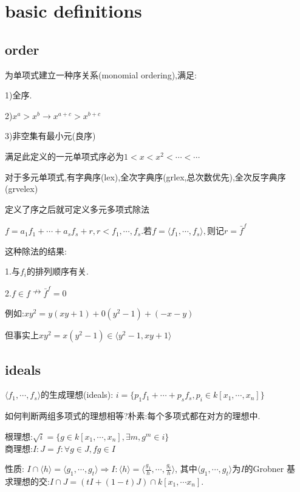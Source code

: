 
\section{basic definitions}
\subsection{order}
为单项式建立一种序关系(monomial ordering),满足:

1)全序.

2)$ x^a>x^b\rightarrow x^{a+c}>x^{b+c}$

3)非空集有最小元(良序)

满足此定义的一元单项式序必为$ 1<x<x^2<\cdots<\cdots$

对于多元单项式,有字典序(lex),全次字典序(grlex,总次数优先),全次反字典序(grvelex)

定义了序之后就可定义多元多项式除法

$ f=a_1f_1+\cdots+a_sf_s+r,r<f_1,\cdots,f_s$.若$ f=\langle f_1,\cdots,f_s \rangle,$则记$ r=\bar{f}^{f}$

这种除法的结果:

1.与$ f_i$的排列顺序有关.

2.$ f\in f \nrightarrow \bar{f}^f=0$

例如:$ xy^2=y(xy+1)+0(y^2-1)+(-x-y)$

但事实上$ xy^2=x(y^2-1)\in \langle y^2-1,xy+1 \rangle$


\subsection{ideals}
$ \langle f_1,\cdots,f_s \rangle$的生成理想(ideals): 
$ i=\{p_1f_1+\cdots+p_sf_s,p_i\in k[x_1,\cdots,x_n]\}$

如何判断两组多项式的理想相等?朴素:每个多项式都在对方的理想中.

根理想:$ \sqrt{i}=\{g\in k[x_1,\cdots,x_n],\exists m,g^m\in i \}$
\\

商理想:$ I:J={f: \forall g \in J,fg\in I }$

性质: $ I\cap \langle h \rangle =\langle g_1,\cdots,g_t \rangle\Rightarrow I:\langle h \rangle=\langle \frac{g_1}{h},\cdots,\frac{g_t}{h} \rangle$,
其中$ \langle g_1,\cdots,g_t \rangle $为$ I$的Grobner 基
\\

求理想的交:$ I\cap J=(tI+(1-t)J)\cap k[x_1,\cdots x_n]$.

